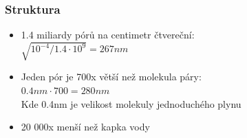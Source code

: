 \begin{frame}
    \frametitle{Struktura}
    \begin{itemize}
            \item 1.4 miliardy pórů na centimetr čtvereční: \\
                $ \sqrt{10^{-4}/1.4\cdot10^{9}} = 267 nm $
            \item Jeden pór je 700x větší než molekula páry: \\
                $ 0.4nm \cdot 700 = 280 nm $ \\
                Kde 0.4nm je velikost molekuly jednoduchého plynu
            \item 20 000x menší než kapka vody
    \end{itemize}
\end{frame}

